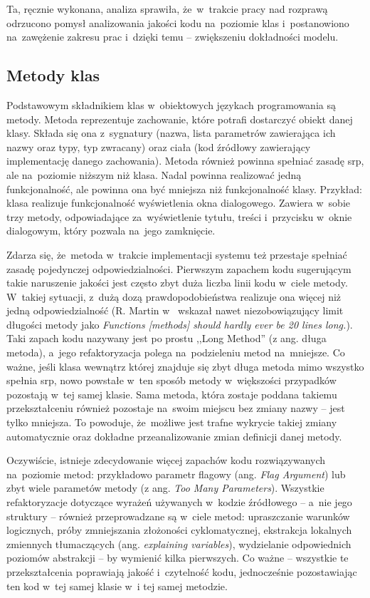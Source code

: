 \documentclass[twoside]{praca}
\begin{document}
Ta, ręcznie wykonana, analiza sprawiła, że~w~trakcie pracy nad rozprawą odrzucono pomysł analizowania jakości kodu na~poziomie klas i~postanowiono na~zawężenie zakresu prac i~dzięki temu -- zwiększeniu dokładności modelu.

\subsection{Metody klas}
\label{sec:impl:methods}

Podstawowym składnikiem klas w~obiektowych językach programowania są metody. Metoda reprezentuje zachowanie, które potrafi dostarczyć obiekt danej klasy. Składa się ona z~sygnatury (nazwa, lista parametrów zawierająca ich nazwy oraz typy, typ zwracany) oraz ciała (kod źródłowy zawierający implementację danego zachowania). Metoda również powinna spełniać zasadę \gls{srp}, ale na~poziomie niższym niż klasa. Nadal powinna realizować jedną funkcjonalność, ale powinna ona być mniejsza niż funkcjonalność klasy. Przykład: klasa realizuje funkcjonalność wyświetlenia okna dialogowego. Zawiera w~sobie trzy metody, odpowiadające za~wyświetlenie tytułu, treści i~przycisku w~oknie dialogowym, który pozwala na~jego zamknięcie.

Zdarza się, że~metoda w~trakcie implementacji systemu też przestaje spełniać zasadę pojedynczej odpowiedzialności. Pierwszym zapachem kodu sugerującym takie naruszenie jakości jest często zbyt duża liczba linii kodu w~ciele metody. W~takiej sytuacji, z~dużą dozą prawdopodobieństwa realizuje ona więcej niż jedną odpowiedzialność (R. Martin w~\cite{martin2009clean} wskazał nawet niezobowiązujący limit długości metody jako \textit{Functions [methods] should hardly ever be 20 lines long.}). Taki zapach kodu nazywany jest po prostu ,,Long Method'' \cite{martin2009clean} (z ang. długa metoda), a~jego refaktoryzacja polega na~podzieleniu metod na~mniejsze. Co ważne, jeśli klasa wewnątrz której znajduje się zbyt długa metoda mimo wszystko spełnia \gls{srp}, nowo powstałe w~ten sposób metody w~większości przypadków pozostają w~tej samej klasie. Sama metoda, która zostaje poddana takiemu przekształceniu również pozostaje na~swoim miejscu bez zmiany nazwy -- jest tylko mniejsza. To powoduje, że~możliwe jest trafne wykrycie takiej zmiany automatycznie oraz dokładne przeanalizowanie zmian definicji danej metody.

Oczywiście, istnieje zdecydowanie więcej zapachów kodu rozwiązywanych na~poziomie metod: przykładowo parametr flagowy (ang. \textit{Flag Argument}) lub zbyt wiele parametów metody (z ang. \textit{Too Many Parameters}). Wszystkie refaktoryzacje dotyczące wyrażeń używanych w~kodzie źródłowego -- a~nie jego struktury -- również przeprowadzane są w~ciele metod: upraszczanie warunków logicznych, próby zmniejszania złożoności cyklomatycznej, ekstrakcja lokalnych zmiennych tłumaczących (ang. \textit{explaining variables}), wydzielanie odpowiednich poziomów abstrakcji -- by wymienić kilka pierwszych. Co ważne -- wszystkie te przekształcenia poprawiają jakość i~czytelność kodu, jednocześnie pozostawiając ten kod w~tej samej klasie w~i tej samej metodzie.
\end{document}
